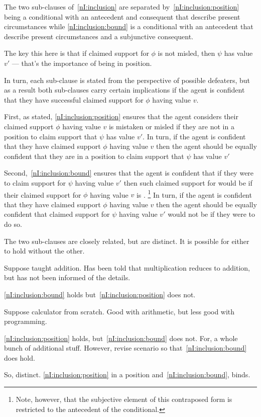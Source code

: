 \begin{note}
  The two sub-clauses of~\ref{nI:inclusion} are separated by~\ref{nI:inclusion:position} being a conditional with an antecedent and consequent that describe present circumstances while \ref{nI:inclusion:bound} is a conditional with an antecedent that describe present circumstances and a subjunctive consequent.

  {
    \color{red}
    The key this here is that if claimed support for \(\phi\) is not misled, then \(\psi\) has value \(v'\) --- that's the importance of being in position.
  }

  In turn, each sub-clause is stated from the perspective of possible defeaters, but as a result both sub-clauses carry certain implications if the agent is confident that they have successful claimed support for \(\phi\) having value \(v\).

  First, as stated, \ref{nI:inclusion:position} ensures that the agent considers their claimed support \(\phi\) having value \(v\) is mistaken or misled if they are not in a position to claim support that \(\psi\) has value \(v'\).
  In turn, if the agent is confident that they have claimed support \(\phi\) having value \(v\) then the agent should be equally confident that they are in a position to claim support that \(\psi\) has value \(v'\)

  Second,~\ref{nI:inclusion:bound} ensures that the agent is confident that if they were to claim support for \(\psi\) having value \(v'\) then such claimed support for would be \mom{} if their claimed support for \(\phi\) having value \(v\) is \mom{}.\nolinebreak
  \footnote{
    Note, however, that the subjective element of this contraposed form is restricted to the antecedent of the conditional.
  }
  In turn, if the agent is confident that they have claimed support \(\phi\) having value \(v\) then the agent should be equally confident that claimed support for \(\psi\) having value \(v'\) would not be \mom{} if they were to do so.

  The two sub-clauses are closely related, but are distinct.
  It is possible for either to hold without the other.

  \begin{illustration}
    Suppose taught addition.
    Has been told that multiplication reduces to addition, but has not been informed of the details.
  \end{illustration}
  \ref{nI:inclusion:bound} holds but~\ref{nI:inclusion:position} does not.

  \begin{illustration}
    Suppose calculator from scratch.
    Good with arithmetic, but less good with programming.
  \end{illustration}
  \ref{nI:inclusion:position} holds, but~\ref{nI:inclusion:bound} does not.
  For, a whole bunch of additional stuff.
  However, revise scenario so that~\ref{nI:inclusion:bound} does hold.

  So, distinct.
  \ref{nI:inclusion:position} in a position and~\ref{nI:inclusion:bound}, binds.
\end{note}

